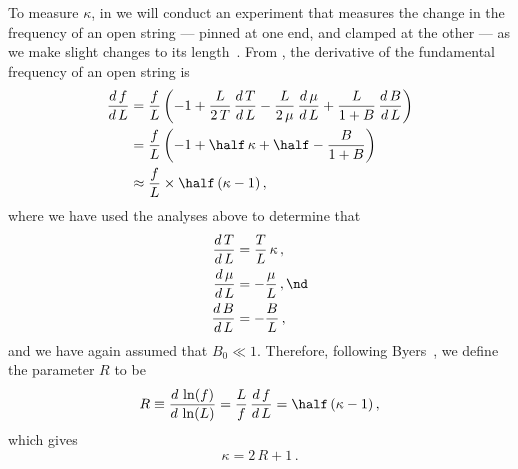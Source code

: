 To measure $\kappa$, in  we will conduct an experiment that measures the change in the frequency of an open string --- pinned at one end, and clamped at the other --- as we make slight changes to its length~\cite{ref:byers1996cgi,ref:varieschi2010icf}. From , the derivative of the fundamental frequency of an open string is
 \begin{equation}
 \begin{split}
\frac{d\, f}{d\, L} &= \frac{f}{L} \left( -1 + \frac{L}{2\, T}\, \frac{d\, T}{d\, L} - \frac{L}{2\, \mu}\, \frac{d\, \mu}{d\, L} + \frac{L}{1 + B}\, \frac{d\, B}{d\, L} \right) \\
&= \frac{f}{L} \left( -1 + \half\, \kappa + \half - \frac{B}{1 + B} \right) \\
&\approx \frac{f}{L} \times \half\, (\kappa - 1)\, ,
 \end{split}
 \end{equation}
where we have used the analyses above to determine that
 \begin{subequations}
 \begin{align}
\frac{d\, T}{d\, L} &= \frac{T}{L}\, \kappa\, , \\
\frac{d\, \mu}{d\, L} &= -\frac{\mu}{L}\, , \nd \\
\frac{d\, B}{d\, L} &= -\frac{B}{L}\, , \\
 \end{align}
 \end{subequations}
and we have again assumed that $B_0 \ll 1$. Therefore, following Byers~\cite{ref:byers1996cgi,ref:varieschi2010icf}, we define the parameter $R$ to be
 \begin{equation}\label{eqn:r_def}
R \equiv \frac{d\, \ln(f)}{d\, \ln(L)} = \frac{L}{f}\, \frac{d\, f}{d\, L} = \half\, (\kappa - 1)\, ,
 \end{equation}
which gives
 \begin{equation} \label{eqn:kappa_r}
\kappa = 2\, R + 1\, .
 \end{equation}


